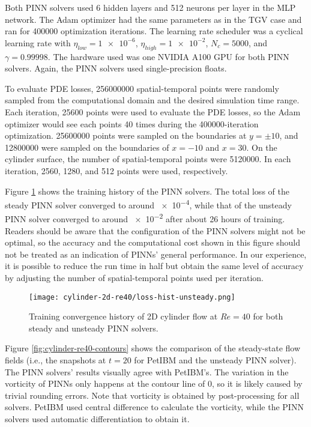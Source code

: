 Both PINN solvers used \num{6} hidden layers and \num{512} neurons per layer in the MLP network.
The Adam optimizer had the same parameters as in the TGV case and ran for \num{400000} optimization iterations.
The learning rate scheduler was a cyclical learning rate with $\eta_{low}=\num{1e-6}$, $\eta_{high}=\num{1e-2}$, $N_c=\num{5000}$, and $\gamma={0.99998}$.
The hardware used was one NVIDIA A100 GPU for both PINN solvers.
Again, the PINN solvers used single-precision floats.

To evaluate PDE losses, \num{256000000} spatial-temporal points were randomly sampled from the computational domain and the desired simulation time range.
Each iteration, \num{25600} points were used to evaluate the PDE losses, so the Adam optimizer would see each points \num{40} times during the \num{400000}-iteration optimization.
\num{25600000} points were sampled on the boundaries at $y=\pm 10$, and \num{12800000} were sampled on the boundaries of $x=-10$ and $x=30$.
On the cylinder surface, the number of spatial-temporal points were \num{5120000}.
In each iteration, \num{2560}, \num{1280}, and \num{512} points were used, respectively.

Figure \ref{fig:cylinder-re40-pinn-loss} shows the training history of the PINN solvers.
The total loss of the steady PINN solver converged to around \num{e-4}, while that of the unsteady PINN solver converged to around \num{e-2} after about 26 hours of training.
Readers should be aware that the configuration of the PINN solvers might not be optimal, so the accuracy and the computational cost shown in this figure should not be treated as an indication of PINNs' general performance.
In our experience, it is possible to reduce the run time in half but obtain the same level of accuracy by adjusting the number of spatial-temporal points used per iteration.

\begin{figure}
    \centering%
    \texttt{[image: cylinder-2d-re40/loss-hist-unsteady.png]}%
    \caption{%
        Training convergence history of 2D cylinder flow at $Re=\num{40}$ for both steady and unsteady PINN solvers.
    }
    \label{fig:cylinder-re40-pinn-loss}%
\end{figure}

Figure \ref{fig:cylinder-re40-contours} shows the comparison of the steady-state flow fields (i.e., the snapshots at $t=20$ for PetIBM and the unsteady PINN solver).
The PINN solvers' results visually agree with PetIBM's.
The variation in the vorticity of PINNs only happens at the contour line of \num{0}, so it is likely caused by trivial rounding errors.
Note that vorticity is obtained by post-processing for all solvers.
PetIBM used central difference to calculate the vorticity, while the PINN solvers used automatic differentiation to obtain it.


